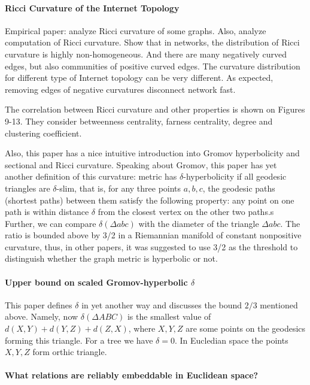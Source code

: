 \documentclass{article}
\begin{document}
\paragraph{Ricci Curvature of the Internet Topology~\cite{ni2015ricci}}

Empirical paper: analyze Ricci curvature of some graphs. Also, analyze computation of Ricci curvature. Show that in networks, the distribution of Ricci curvature is highly
non-homogeneous. And there are many negatively curved edges, but also communities of positive curved edges. The curvature distribution for different
type of Internet topology can be very different. As expected, removing edges of negative curvatures disconnect network fast.

The correlation between Ricci curvature and other properties is shown on Figures 9-13. They consider betweenness centrality, farness centrality, degree and clustering coefficient.

Also, this paper has a nice intuitive introduction into Gromov hyperbolicity and sectional and Ricci curvature. Speaking about Gromov, this paper has yet another definition of this curvature: metric has $\delta$-hyperbolicity if all geodesic triangles are $\delta$-slim, that is, for any three points
$a, b, c$, the geodesic paths (shortest paths) between them satisfy
the following property: any point on one path is within
distance $\delta$ from the closest vertex on the other two paths.s
Further, we can compare $\delta(\Delta abc)$ with
the diameter of the triangle $\Delta abc$. The ratio is bounded above
by 3/2 in a Riemannian manifold of constant nonpositive
curvature, thus, in other papers, it was suggested to use 3/2 as the threshold to
distinguish whether the graph metric is hyperbolic or not.

\paragraph{Upper bound on scaled Gromov-hyperbolic $\delta$~\cite{jonckheere2007upper}}

This paper defines $\delta$ in yet another way and discusses the bound $2/3$ mentioned above. Namely, now $\delta(\Delta ABC)$ is the smallest value of $d(X,Y) + d(Y,Z) + d(Z, X)$, where $X, Y, Z$ are some points on the geodesics forming this triangle. For a tree we have $\delta = 0$. In Eucledian space the points $X, Y, Z$ form orthic triangle.

\paragraph{What relations are reliably embeddable in Euclidean space?~\cite{bhattacharjee2019relations}}
\end{document}
